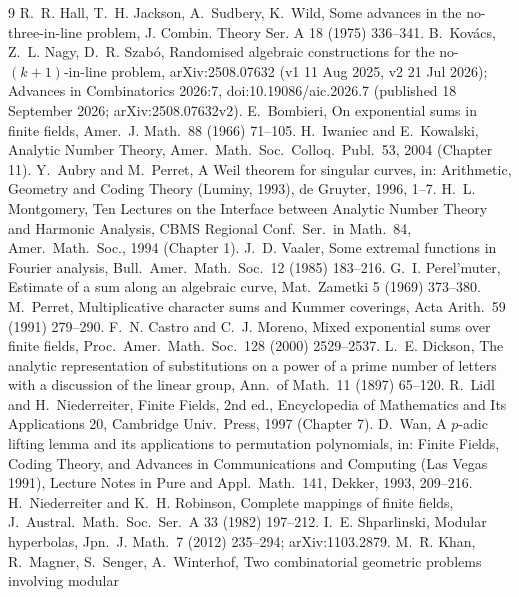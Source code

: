 \documentclass[11pt]{article}
\theoremstyle{remark}
\begin{document}


\begin{thebibliography}{9}
 R.~R. Hall, T.~H. Jackson, A.~Sudbery, K.~Wild, Some advances in the no-three-in-line problem,
 J. Combin. Theory Ser. A 18 (1975) 336--341.
 B.~Kov\'acs, Z.~L. Nagy, D.~R. Szab\'o, Randomised algebraic constructions for the no-$(k+1)$-in-line
 problem, arXiv:2508.07632 (v1 11 Aug 2025, v2 21 Jul 2026); Advances in Combinatorics 2026:7, doi:10.19086/aic.2026.7
 (published 18 September 2026; arXiv:2508.07632v2).
 E.~Bombieri, On exponential sums in finite fields, Amer.\ J. Math.\ 88 (1966) 71--105.
 H.~Iwaniec and E.~Kowalski, Analytic Number Theory, Amer.\ Math.\ Soc.\ Colloq.\ Publ.\ 53, 2004 (Chapter 11).
 Y.~Aubry and M.~Perret, A Weil theorem for singular curves, in: Arithmetic, Geometry and Coding Theory
 (Luminy, 1993), de Gruyter, 1996, 1--7.
 H.~L. Montgomery, Ten Lectures on the Interface between Analytic Number Theory and Harmonic Analysis,
 CBMS Regional Conf.\ Ser.\ in Math.\ 84, Amer.\ Math.\ Soc., 1994 (Chapter 1).
 J.~D. Vaaler, Some extremal functions in Fourier analysis, Bull.\ Amer.\ Math.\ Soc.\ 12 (1985) 183--216.
 G.~I. Perel'muter, Estimate of a sum along an algebraic curve, Mat.\ Zametki 5 (1969) 373--380.
 M.~Perret, Multiplicative character sums and Kummer coverings, Acta Arith.\ 59 (1991) 279--290.
 F.~N. Castro and C.~J. Moreno, Mixed exponential sums over finite fields, Proc.\ Amer.\ Math.\ Soc.\ 128 (2000) 2529--2537.
 L.~E. Dickson, The analytic representation of substitutions on a power of a prime number of letters with a discussion of
 the linear group, Ann.\ of Math.\ 11 (1897) 65--120.
 R.~Lidl and H.~Niederreiter, Finite Fields, 2nd ed., Encyclopedia of Mathematics and Its Applications 20,
 Cambridge Univ.\ Press, 1997 (Chapter 7).
 D.~Wan, A $p$-adic lifting lemma and its applications to permutation polynomials, in: Finite Fields, Coding Theory, and Advances in
 Communications and Computing (Las Vegas 1991), Lecture Notes in Pure and Appl.\ Math.\ 141, Dekker, 1993, 209--216.
 H.~Niederreiter and K.~H. Robinson, Complete mappings of finite fields, J.\ Austral.\ Math.\ Soc.\ Ser.\ A 33 (1982) 197--212.
 I.~E. Shparlinski, Modular hyperbolas, Jpn.\ J. Math.\ 7 (2012) 235--294; arXiv:1103.2879.
 M.~R. Khan, R.~Magner, S.~Senger, A.~Winterhof, Two combinatorial geometric problems involving modular

\end{thebibliography}
\end{document}
